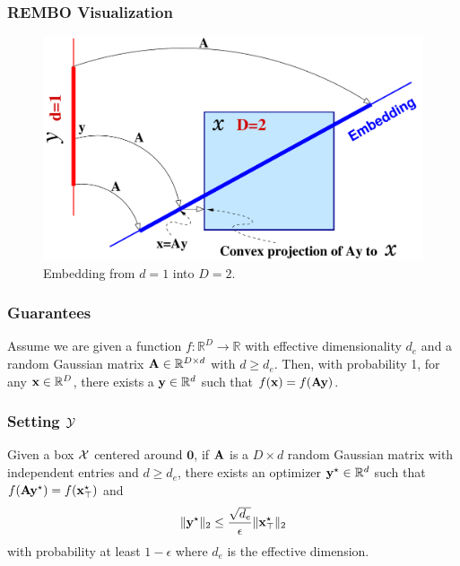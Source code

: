 \documentclass[grey]{beamer}
\begin{document}
 \begin{frame}
 \frametitle{REMBO Visualization}
  \begin{figure}[t!]
\centering
  \includegraphics[scale=0.28]{../paper/figures/projection.pdf}
  \caption{Embedding from $d=1$ into $D=2$. 
  }
  \label{fig:proj}
  \vspace{-1em}
\end{figure}
 \end{frame}
 
 \begin{frame}
  \frametitle{Guarantees}
  \begin{theorem}
   \label{prop:1}
   Assume we are given a function $f: \mathbb{R}^{D} \rightarrow \mathbb{R}$ with effective dimensionality $d_e$ and a random Gaussian matrix $\mathbf{A} \in \mathbb{R}^{D\times d}$ with $d\geq d_e$. Then, with probability 1, for any $\mathbf{x} \in \mathbb{R}^D$, there exists a $ \mathbf{y} \in \mathbb{R}^d$ such that $f(\mathbf{x}) = f(\mathbf{A}\mathbf{y})$.
  \end{theorem}
 \end{frame}
 
 \begin{frame}
  \frametitle{Setting $\cal Y$}
  \begin{theorem}
   \label{prop:2}
   Given a box $\cal X$ centered around $\mathbf{0}$, if $\mathbf{A}$ is a $D\times d$ random Gaussian matrix 
   with independent entries and $d\geq d_e$,
   there exists an optimizer $\mathbf{y}^\star \in \mathbb{R}^{d}$ such that $f(\mathbf{A}\mathbf{y}^\star) = f(\mathbf{x}^\star_\top)$ and $$\|\mathbf{y}^\star\|_2 \leq \frac{\sqrt{d_e}}{\epsilon}\|\mathbf{x}^{\star}_\top\|_2$$ with probability at least $1-\epsilon$ where $d_e$ is
   the effective dimension.
 \end{theorem}
 \end{frame}
 
\end{document}
